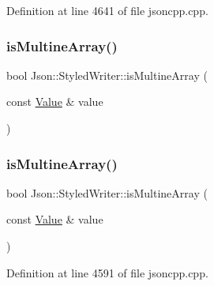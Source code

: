 Definition at line 4641 of file jsoncpp.\+cpp.

\hypertarget{class_json_1_1_styled_writer_aa5dc671edf10b9976f1511da2271ab9d}{}\label{class_json_1_1_styled_writer_aa5dc671edf10b9976f1511da2271ab9d} 
\subsubsection{\texorpdfstring{is\+Multine\+Array()}{isMultineArray()}\hspace{0.1cm}{\footnotesize\ttfamily [1/2]}}
{\footnotesize\ttfamily bool Json\+::\+Styled\+Writer\+::is\+Multine\+Array (\begin{DoxyParamCaption}\item[{const \hyperlink{class_json_1_1_value}{Value} \&}]{value }\end{DoxyParamCaption})\hspace{0.3cm}{\ttfamily [private]}}

\hypertarget{class_json_1_1_styled_writer_aa5dc671edf10b9976f1511da2271ab9d}{}\label{class_json_1_1_styled_writer_aa5dc671edf10b9976f1511da2271ab9d} 
\subsubsection{\texorpdfstring{is\+Multine\+Array()}{isMultineArray()}\hspace{0.1cm}{\footnotesize\ttfamily [2/2]}}
{\footnotesize\ttfamily bool Json\+::\+Styled\+Writer\+::is\+Multine\+Array (\begin{DoxyParamCaption}\item[{const \hyperlink{class_json_1_1_value}{Value} \&}]{value }\end{DoxyParamCaption})\hspace{0.3cm}{\ttfamily [private]}}



Definition at line 4591 of file jsoncpp.\+cpp.

\hypertarget{class_json_1_1_styled_writer_a692dda1b1621fb5620e0a7b1b10f3b1f}{}\label{class_json_1_1_styled_writer_a692dda1b1621fb5620e0a7b1b10f3b1f} 
